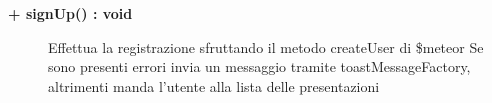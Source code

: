 \begin{description}
	\begin{description}
		\item[\textbf{\color{blue}+ signUp() : void			}] \hfill
			Effettua la registrazione sfruttando il metodo createUser di \$meteor
			Se sono presenti errori invia un messaggio tramite toastMessageFactory, altrimenti manda l'utente alla lista delle presentazioni
	\end{description}

\end{description}
















